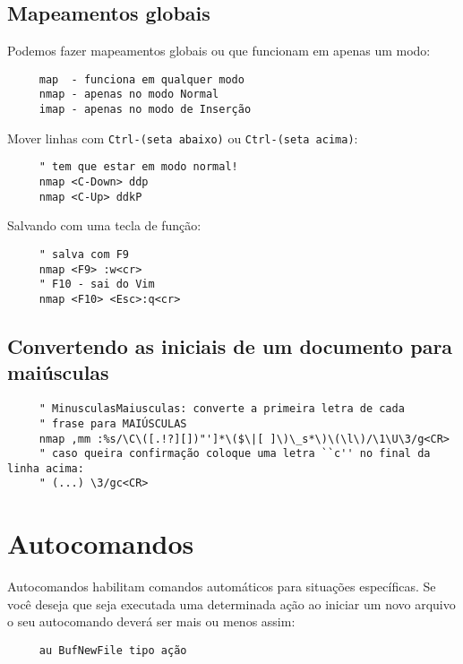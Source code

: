 \subsection{Mapeamentos globais}


Podemos fazer mapeamentos globais ou que funcionam em apenas um modo:

\begin{verbatim}
     map  - funciona em qualquer modo
     nmap - apenas no modo Normal
     imap - apenas no modo de Inserção
\end{verbatim}

Mover linhas com {\tt Ctrl-(seta abaixo)} ou {\tt Ctrl-(seta acima)}:

\begin{verbatim}
     " tem que estar em modo normal!
     nmap <C-Down> ddp
     nmap <C-Up> ddkP
\end{verbatim}

Salvando com uma tecla de função:

\begin{verbatim}
     " salva com F9
     nmap <F9> :w<cr>
     " F10 - sai do Vim
     nmap <F10> <Esc>:q<cr>
\end{verbatim}

\subsection{Convertendo as iniciais de um documento para maiúsculas}
\label{Convertendo as iniciais de um documento para maiúsculas}

\begin{verbatim}
     " MinusculasMaiusculas: converte a primeira letra de cada
     " frase para MAIÚSCULAS
     nmap ,mm :%s/\C\([.!?][])"']*\($\|[ ]\)\_s*\)\(\l\)/\1\U\3/g<CR>
     " caso queira confirmação coloque uma letra ``c'' no final da linha acima:
     " (...) \3/gc<CR>
\end{verbatim}

\section{Autocomandos }\label{Autocomandos }

Autocomandos habilitam comandos automáticos para situações
específicas. Se você deseja que seja executada uma determinada ação ao
iniciar um novo arquivo o seu autocomando deverá ser mais ou menos
assim:

\begin{verbatim}
     au BufNewFile tipo ação
\end{verbatim}

